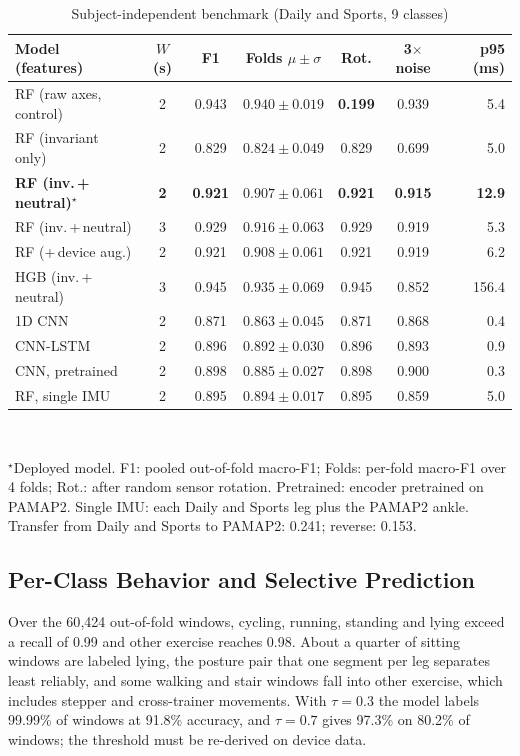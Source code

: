 \documentclass[conference]{IEEEtran}
\begin{document}
\begin{table}[t]
\caption{Subject-independent benchmark (Daily and Sports, 9 classes)}
\label{tab:bench}
\centering
\scriptsize
\setlength{\tabcolsep}{2.2pt}
\begin{tabular}{@{}lcccccr@{}}
\toprule
Model (features) & $W$ (s) & F1 & Folds $\mu\pm\sigma$ & Rot. & 3$\times$noise & p95 (ms) \\
\midrule
RF (raw axes, control) & 2 & 0.943 & $0.940\pm0.019$ & \textbf{0.199} & 0.939 & 5.4 \\
RF (invariant only) & 2 & 0.829 & $0.824\pm0.049$ & 0.829 & 0.699 & 5.0 \\
\textbf{RF (inv.\,+\,neutral)$^\star$} & \textbf{2} & \textbf{0.921} & $\mathbf{0.907\pm0.061}$ & \textbf{0.921} & \textbf{0.915} & \textbf{12.9} \\
RF (inv.\,+\,neutral) & 3 & 0.929 & $0.916\pm0.063$ & 0.929 & 0.919 & 5.3 \\
RF (+\,device aug.) & 2 & 0.921 & $0.908\pm0.061$ & 0.921 & 0.919 & 6.2 \\
HGB (inv.\,+\,neutral) & 3 & 0.945 & $0.935\pm0.069$ & 0.945 & 0.852 & 156.4 \\
1D CNN & 2 & 0.871 & $0.863\pm0.045$ & 0.871 & 0.868 & 0.4 \\
CNN-LSTM & 2 & 0.896 & $0.892\pm0.030$ & 0.896 & 0.893 & 0.9 \\
CNN, pretrained & 2 & 0.898 & $0.885\pm0.027$ & 0.898 & 0.900 & 0.3 \\
\midrule
RF, single IMU & 2 & 0.895 & $0.894\pm0.017$ & 0.895 & 0.859 & 5.0 \\
\bottomrule
\end{tabular}\\[2pt]
\parbox{\columnwidth}{\scriptsize $^\star$Deployed model. F1: pooled out-of-fold macro-F1; Folds: per-fold macro-F1 over 4 folds; Rot.: after random sensor rotation. Pretrained: encoder pretrained on PAMAP2. Single IMU: each Daily and Sports leg plus the PAMAP2 ankle. Transfer from Daily and Sports to PAMAP2: 0.241; reverse: 0.153.}
\end{table}

\subsection{Per-Class Behavior and Selective Prediction}
Over the 60{,}424 out-of-fold windows, cycling, running, standing and lying exceed a recall of 0.99 and other exercise reaches 0.98. About a quarter of sitting windows are labeled lying, the posture pair that one segment per leg separates least reliably, and some walking and stair windows fall into other exercise, which includes stepper and cross-trainer movements. With $\tau=0.3$ the model labels 99.99\% of windows at 91.8\% accuracy, and $\tau=0.7$ gives 97.3\% on 80.2\% of windows; the threshold must be re-derived on device data.
\end{document}
